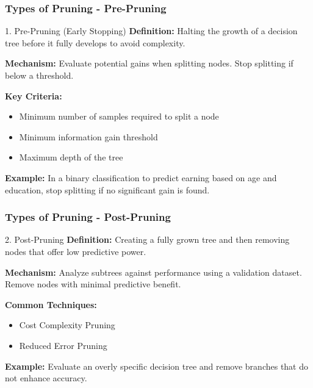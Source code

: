 \documentclass[aspectratio=169]{beamer}
\begin{document}
\begin{frame}[fragile]
    \frametitle{Types of Pruning - Pre-Pruning}
    \begin{block}{1. Pre-Pruning (Early Stopping)}
        \textbf{Definition:} Halting the growth of a decision tree before it fully develops to avoid complexity.
        
        \textbf{Mechanism:} Evaluate potential gains when splitting nodes. Stop splitting if below a threshold.
        
        \textbf{Key Criteria:}
        \begin{itemize}
            \item Minimum number of samples required to split a node
            \item Minimum information gain threshold
            \item Maximum depth of the tree
        \end{itemize}
        
        \textbf{Example:} In a binary classification to predict earning based on age and education, stop splitting if no significant gain is found.
    \end{block}
\end{frame}

\begin{frame}[fragile]
    \frametitle{Types of Pruning - Post-Pruning}
    \begin{block}{2. Post-Pruning}
        \textbf{Definition:} Creating a fully grown tree and then removing nodes that offer low predictive power.
        
        \textbf{Mechanism:} Analyze subtrees against performance using a validation dataset. Remove nodes with minimal predictive benefit.
        
        \textbf{Common Techniques:}
        \begin{itemize}
            \item Cost Complexity Pruning
            \item Reduced Error Pruning
        \end{itemize}
        
        \textbf{Example:} Evaluate an overly specific decision tree and remove branches that do not enhance accuracy.
    \end{block}
\end{frame}
\end{document}
